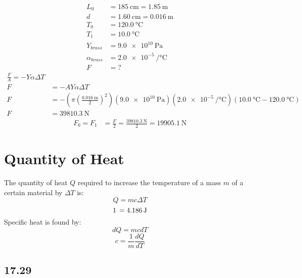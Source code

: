 \documentclass{article}
\begin{document}
\begin{align*}
	L_0 & = \SI{185}{\centi \meter} = \SI{1.85}{\meter} \\
	d & = \SI{1.60}{\centi \meter} = \SI{0.016}{\meter} \\
	T_0 & = \SI{120.0}{\celsius} \\
	T_1 & = \SI{10.0}{\celsius} \\
	Y_{brass} & = \SI{9.0e10}{\pascal} \\
	\alpha_{brass} & = \SI{2.0e-5}{\per \celsius} \\
	F & = ?
\end{align*}
\begin{align*}
	\frac{ F }{ A } = -Y\alpha \Delta T \\
	F & = -AY\alpha \Delta T \\
	F & = -\left( \pi \left( \frac{ \SI{0.016}{\meter} }{ 2 } \right)^2 \right)(\SI{9.0e10}{\pascal})(\SI{2.0e-5}{\per \celsius})(\SI{10.0}{\celsius} - \SI{120.0}{\celsius}) \\
	F & = \SI{39810.3}{\newton}
\end{align*}
\begin{align*}
	F_0 = F_1 & = \frac{ F }{ 2 } = \frac{ \SI{39810.3}{\newton} }{ 2 } = \SI{19905.1}{\newton}
\end{align*}

\section{Quantity of Heat}

The quantity of heat $ Q $ required to increase the temperature of a mass $ m $ of a certain  material by $ \Delta T $ is:
\begin{equation}
	Q = mc\Delta T
\end{equation}
\begin{equation}
	\SI{1}{\cal} = \SI{4.186}{\joule}
\end{equation}
Specific heat is found by:
\begin{equation*}
	dQ = mcdT
\end{equation*}
\begin{equation}
	c = \frac{1}{m}\frac{dQ}{dT}
\end{equation}

\subsection{17.29}
\end{document}
